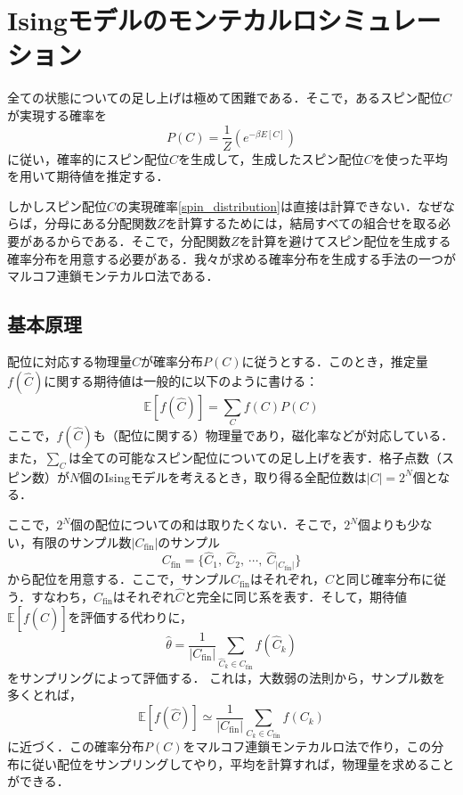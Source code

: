 \section{Isingモデルのモンテカルロシミュレーション}
全ての状態についての足し上げは極めて困難である．そこで，あるスピン配位$C$が実現する確率を
\begin{equation}\label{spin_distribution}
    P(C) = \frac{1}{Z}(e^{-\beta E[C]})
\end{equation}
に従い，確率的にスピン配位$C$を生成して，生成したスピン配位$C$を使った平均を用いて期待値を推定する．

しかしスピン配位$C$の実現確率\eqref{spin_distribution}は直接は計算できない．なぜならば，分母にある分配関数$Z$を計算するためには，結局すべての組合せを取る必要があるからである．そこで，分配関数$Z$を計算を避けてスピン配位を生成する確率分布を用意する必要がある．我々が求める確率分布を生成する手法の一つがマルコフ連鎖モンテカルロ法である．

\subsection{基本原理}
配位に対応する物理量$\hat{C}$が確率分布$P(C)$に従うとする．このとき，推定量$f(\hat{C})$に関する期待値は一般的に以下のように書ける：
\begin{equation}
    \mathbb{E}[f(\hat{C})] = \sum_{C}f(C)P(C)
\end{equation}
ここで，$f(\hat{C})$も（配位に関する）物理量であり，磁化率などが対応している．また，$\sum_{C}$は全ての可能なスピン配位についての足し上げを表す．格子点数（スピン数）が$N$個のIsingモデルを考えるとき，取り得る全配位数は$|C|=2^N$個となる．

ここで，$2^N$個の配位についての和は取りたくない．そこで，$2^N$個よりも少ない，有限のサンプル数$|C_{\text{fin}}|$のサンプル
\begin{equation}
    C_{\text{fin}} = \{\hat{C}_{1},\ \hat{C}_{2},\ \cdots,\ \hat{C}_{|C_{\text{fin}}|}\}
\end{equation}
から配位を用意する．ここで，サンプル$C_{\text{fin}}$はそれぞれ，$\hat{C}$と同じ確率分布に従う．すなわち，$C_{\text{fin}}$はそれぞれ$\hat{C}$と完全に同じ系を表す．そして，期待値$\mathbb{E}[f(\hat{C})]$を評価する代わりに，
\begin{equation}
    \hat{\theta} = \frac{1}{|C_{\text{fin}}|}\sum_{\hat{C}_{k}\in C_{\text{fin}}}
    f(\hat{C}_k)
\end{equation}
をサンプリングによって評価する．
これは，大数弱の法則から，サンプル数を多くとれば，
\begin{equation}
    \mathbb{E}[f(\hat{C})] \simeq \frac{1}{|C_{\text{fin}}|}\sum_{C_{k}\in C_{\text{fin}}} f(C_{k})
\end{equation}
に近づく．この確率分布$P(C)$をマルコフ連鎖モンテカルロ法で作り，この分布に従い配位をサンプリングしてやり，平均を計算すれば，物理量を求めることができる．
